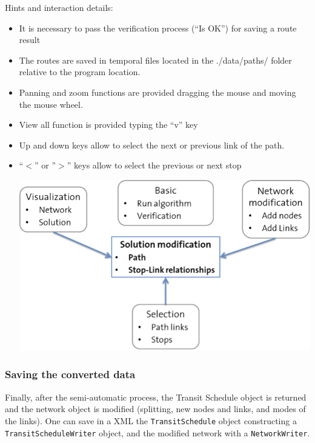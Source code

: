 Hints and interaction details:
\begin{itemize}
	\item It is necessary to pass the verification process (“Is OK”) for saving a route result
	\item The routes are saved in temporal files located in the ./data/paths/ folder relative to the program location.
	\item Panning and zoom functions are provided dragging the mouse and moving the mouse wheel.
	\item View all function is provided typing the “v” key
	\item Up and down keys allow to select the next or previous link of the path.
	\item “$<$” or ”$>$” keys allow to select the previous or next stop 

\begin{figure}[htp]

\end{figure}
	\includegraphics{figures/gtfs2schedule/gtfsManualEdit.png}
\end{itemize}

\subsubsection{Saving the converted data}

Finally, after the semi-automatic process, the Transit Schedule  object is returned and the network object is modified (splitting, new  nodes and links, and modes of the links). One can save in a XML  the 
\texttt{TransitSchedule} object constructing a 
\texttt{TransitScheduleWriter} object, and the modified network with a 
\texttt{NetworkWriter}.
